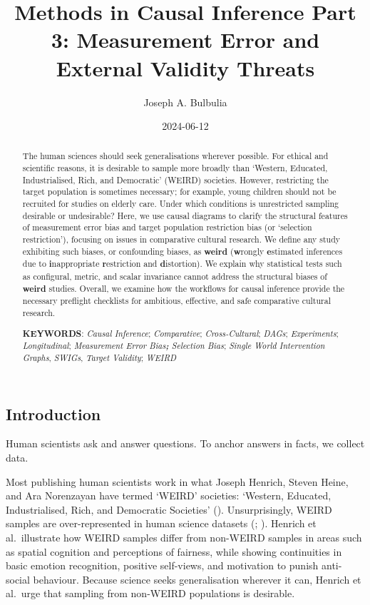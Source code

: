 \documentclass[
  single column]{article}
\title{Methods in Causal Inference Part 3: Measurement Error and
External Validity Threats}
\author{Joseph A. Bulbulia}
\affil{%
             \small{     Victoria University of Wellington, New Zealand
          ORCID \textcolor[HTML]{A6CE39}{\aiOrcid} ~0000-0002-5861-2056 }
              }
\date{2024-06-12}
\begin{document}
\maketitle
\begin{abstract}
The human sciences should seek generalisations wherever possible. For
ethical and scientific reasons, it is desirable to sample more broadly
than `Western, Educated, Industrialised, Rich, and Democratic' (WEIRD)
societies. However, restricting the target population is sometimes
necessary; for example, young children should not be recruited for
studies on elderly care. Under which conditions is unrestricted sampling
desirable or undesirable? Here, we use causal diagrams to clarify the
structural features of measurement error bias and target population
restriction bias (or `selection restriction'), focusing on issues in
comparative cultural research. We define any study exhibiting such
biases, or confounding biases, as \textbf{weird} (\textbf{w}rongly
\textbf{e}stimated inferences due to \textbf{i}nappropriate
\textbf{r}estriction and \textbf{d}istortion). We explain why
statistical tests such as configural, metric, and scalar invariance
cannot address the structural biases of \textbf{weird} studies. Overall,
we examine how the workflows for causal inference provide the necessary
preflight checklists for ambitious, effective, and safe comparative
cultural research.

\textbf{KEYWORDS}: \emph{Causal Inference}; \emph{Comparative};
\emph{Cross-Cultural}; \emph{DAGs}; \emph{Experiments};
\emph{Longitudinal}; \emph{Measurement Error Bias\textbf{; }Selection
Bias}; \emph{Single World Intervention Graphs}, \emph{SWIGs},
\emph{Target Validity}; \emph{WEIRD}
\end{abstract}

\subsection{Introduction}\label{id-sec-intro}

Human scientists ask and answer questions. To anchor answers in facts,
we collect data.

Most publishing human scientists work in what Joseph Henrich, Steven
Heine, and Ara Norenzayan have termed `WEIRD' societies: `Western,
Educated, Industrialised, Rich, and Democratic Societies'
().
Unsurprisingly, WEIRD samples are over-represented in human science
datasets (;
). Henrich et al.~illustrate
how WEIRD samples differ from non-WEIRD samples in areas such as spatial
cognition and perceptions of fairness, while showing continuities in
basic emotion recognition, positive self-views, and motivation to punish
anti-social behaviour. Because science seeks generalisation wherever it
can, Henrich et al.~urge that sampling from non-WEIRD populations is
desirable.
\end{document}
